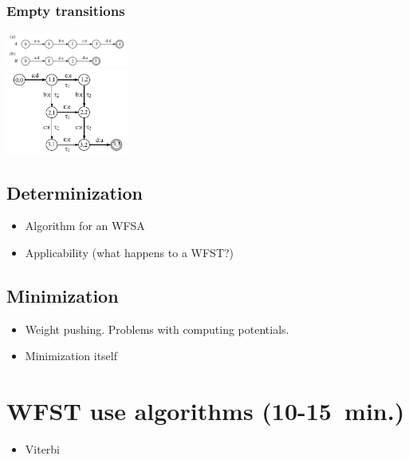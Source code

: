 \documentclass{beamer}
\newcommand{\<}{\langle}
\renewcommand{\>}{\rangle}
\begin{document}
\begin{frame}
  \frametitle{Empty transitions}

  \includegraphics[width=4cm]{composition-example-1.png}\\
  \includegraphics[width=4cm]{composition-example-2.png}

\end{frame}

\subsection{Determinization}
\begin{frame}
  \begin{itemize}
  \item Algorithm for an WFSA
  \item Applicability (what happens to a WFST?)
  \end{itemize}
\end{frame}

\subsection{Minimization}

\begin{frame}
  \begin{itemize}
  \item Weight pushing. Problems with computing potentials.
  \item Minimization itself
  \end{itemize}
\end{frame}
\section{WFST use algorithms (10-15~min.)}

\begin{frame}
  \begin{itemize}
  \item Viterbi
  \end{itemize}
\end{frame}
\end{document}

